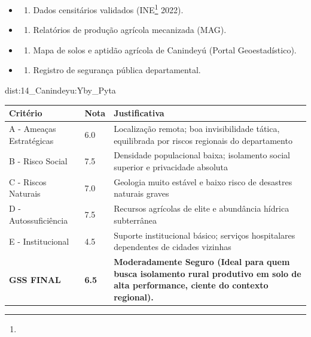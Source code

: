 {\begin{itemize}
\tightlist
\item
  \begin{enumerate}
  \def\labelenumi{\arabic{enumi})}
  \tightlist
  \item
    Dados censitários validados (INE\footnote{\fineINE} 2022).
  \end{enumerate}
\item
  \begin{enumerate}
  \def\labelenumi{\arabic{enumi})}
  \setcounter{enumi}{1}
  \tightlist
  \item
    Relatórios de produção agrícola mecanizada (MAG).
  \end{enumerate}
\item
  \begin{enumerate}
  \def\labelenumi{\arabic{enumi})}
  \setcounter{enumi}{2}
  \tightlist
  \item
    Mapa de solos e aptidão agrícola de Canindeyú (Portal
    Geoestadístico).
  \end{enumerate}
\item
  \begin{enumerate}
  \def\labelenumi{\arabic{enumi})}
  \setcounter{enumi}{3}
  \tightlist
  \item
    Registro de segurança pública departamental.
  \end{enumerate}
\end{itemize}}{dist:14_Canindeyu:Yby_Pyta}
\begin{table}[ht!]
\small \begin{tabular}{p{3.0cm}p{0.8cm}p{6.0cm}} \toprule
\textbf{Critério} & \textbf{Nota} & \textbf{Justificativa} \\ \midrule
A - Ameaças Estratégicas & 6.0 & Localização remota; boa invisibilidade tática, equilibrada por riscos regionais do departamento \\
B - Risco Social & 7.5 & Densidade populacional baixa; isolamento social superior e privacidade absoluta \\
C - Riscos Naturais & 7.0 & Geologia muito estável e baixo risco de desastres naturais graves \\
D - Autossuficiência & 7.5 & Recursos agrícolas de elite e abundância hídrica subterrânea \\
E - Institucional & 4.5 & Suporte institucional básico; serviços hospitalares dependentes de cidades vizinhas \\
\midrule \textbf{GSS FINAL} & \textbf{6.5} & \textbf{Moderadamente Seguro (Ideal para quem busca isolamento rural produtivo em solo de alta performance, ciente do contexto regional).} \\ \bottomrule \end{tabular}
\end{table}
